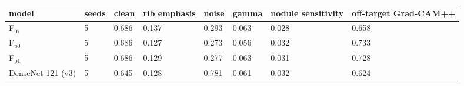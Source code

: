 \begin{tabular}{llllllll}
\toprule
model & seeds & clean & rib emphasis & noise & gamma & nodule sensitivity & off-target Grad-CAM++ \\
\midrule
F$_\mathrm{in}$ & 5 & 0.686 & 0.137 & 0.293 & 0.063 & 0.028 & 0.658 \\
F$_\mathrm{p0}$ & 5 & 0.686 & 0.127 & 0.273 & 0.056 & 0.032 & 0.733 \\
F$_\mathrm{p1}$ & 5 & 0.686 & 0.129 & 0.277 & 0.063 & 0.031 & 0.728 \\
DenseNet-121 (v3) & 5 & 0.645 & 0.128 & 0.781 & 0.061 & 0.032 & 0.624 \\
\bottomrule
\end{tabular}
